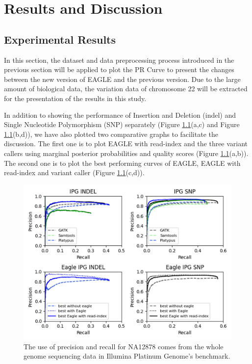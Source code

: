 \documentclass[PhD]{PHlab-thesis}
\begin{document}
\chapter{Results and Discussion}
\section{Experimental Results}
In this section, the dataset and data preprocessing process introduced in the previous section will be applied to plot the PR Curve to present the changes between the new version of EAGLE and the previous version. Due to the large amount of biological data, the variation data of chromosome 22 will be extracted for the presentation of the results in this study.

In addition to showing the performance of Insertion and Deletion (indel) and Single Nucleotide Polymorphism (SNP) separately (Figure \ref{fig:The result of IPG dataset}(a,c) and Figure \ref{fig:The result of IPG dataset}(b,d)), we have also plotted two comparative graphs to facilitate the discussion.
The first one is to plot EAGLE with read-index and the three variant callers using marginal posterior probabilities and quality scores (Figure \ref{fig:The result of IPG dataset}(a,b)).
The second one is to plot the best performing curves of EAGLE, EAGLE with read-index and variant caller (Figure \ref{fig:The result of IPG dataset}(c,d)).

\begin{figure}[h!]
	\centering
	\includegraphics[scale=0.45]{figures/IPG result.png}
	\caption{The use of precision and recall for NA12878 comes from the whole genome sequencing data in Illumina Platinum Genome’s benchmark.}
	\label{fig:The result of IPG dataset} %
\end{figure}
\end{document}
